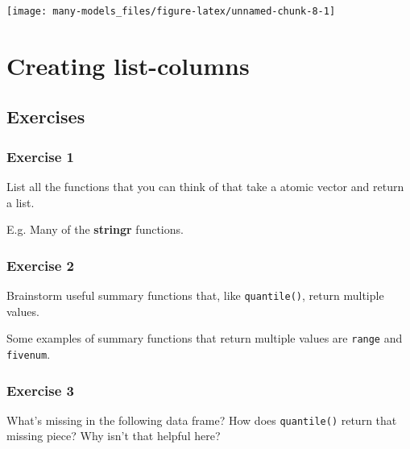 \documentclass[]{book}
\newenvironment{Shaded}{\begin{snugshade}}{\end{snugshade}}
\newcommand{\CommentTok}[1]{\textcolor[rgb]{0.56,0.35,0.01}{\textit{#1}}}
\newcommand{\DataTypeTok}[1]{\textcolor[rgb]{0.13,0.29,0.53}{#1}}
\newcommand{\KeywordTok}[1]{\textcolor[rgb]{0.13,0.29,0.53}{\textbf{#1}}}
\newcommand{\NormalTok}[1]{#1}
\newcommand{\OperatorTok}[1]{\textcolor[rgb]{0.81,0.36,0.00}{\textbf{#1}}}
\newcommand{\StringTok}[1]{\textcolor[rgb]{0.31,0.60,0.02}{#1}}
\theoremstyle{definition}
\theoremstyle{definition}
\theoremstyle{definition}
\theoremstyle{remark}
\begin{document}
\begin{center}\texttt{[image: many-models\_files/figure-latex/unnamed-chunk-8-1]} \end{center}

\hypertarget{creating-list-columns}{%
\section{Creating list-columns}\label{creating-list-columns}}

\hypertarget{exercises-4}{%
\subsection{Exercises}\label{exercises-4}}

\hypertarget{exercise-1-63}{%
\subsubsection{Exercise 1}\label{exercise-1-63}}

List all the functions that you can think of that take a atomic vector
and return a list.

E.g. Many of the \textbf{stringr} functions.

\hypertarget{exercise-2-62}{%
\subsubsection{Exercise 2}\label{exercise-2-62}}

Brainstorm useful summary functions that, like \texttt{quantile()},
return multiple values.

Some examples of summary functions that return multiple values are
\texttt{range} and \texttt{fivenum}.

\hypertarget{exercise-3-47}{%
\subsubsection{Exercise 3}\label{exercise-3-47}}

What's missing in the following data frame? How does \texttt{quantile()}
return that missing piece? Why isn't that helpful here?

\begin{Shaded}
\end{Shaded}
\end{document}

